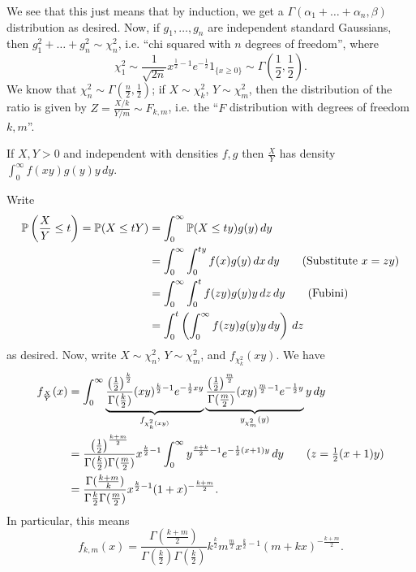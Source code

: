 We see that this just means that by induction, we get a $\Gamma(\alpha_1 + \dots + \alpha_n, \beta)$ distribution as desired. Now, if $g_1, \dots, g_n$ are independent standard Gaussians, then $g_1^2 + \dots + g_n^2 \sim \chi_n^2$, i.e. ``chi squared with $n$ degrees of freedom'', where
\[ \chi_1^2 \sim \frac{1}{\sqrt{2n}} x^{\frac{1}{2} - 1} e^{-\frac{1}{2}} 1_{\{x \geq 0\}} \sim \Gamma\left(\frac{1}{2}, \frac{1}{2}\right). \]
We know that $\chi_n^2 \sim \Gamma(\frac{n}{2}, \frac{1}{2})$; if $X \sim \chi_k^2$, $Y \sim \chi_m^2$, then the distribution of the ratio is given by $Z = \frac{X/k}{Y/m} \sim F_{k, m}$, i.e. the ``$F$ distribution with degrees of freedom $k, m$''.
\begin{simplelemma}
    If $X, Y > 0$ and independent with densities $f, g$ then $\frac{X}{Y}$ has density $\int_0^\infty f(xy)g(y) y \, dy$.
\end{simplelemma}
\noindent Write
\begin{align*}
    \mathbb P \left( \frac{X}{Y} \leq t \right) = \mathbb P(X \leq tY) &= \int_0^\infty \mathbb P(X \leq ty) g(y) \, dy \\
    &= \int_0^\infty \int_0^{ty} f(x) g(y) \, dx \, dy \tag{Substitute $x = zy$} \\
    &= \int_0^\infty \int_0^t f(zy) g(y) y \, dz \, dy \tag{Fubini} \\
    &= \int_0^t \left(\int_0^\infty f(zy) g(y) y \, dy \right) \, dz
\end{align*}
as desired. Now, write $X \sim \chi_n^2$, $Y \sim \chi_m^2$, and $f_{\chi_k^2} (xy)$. We have
\begin{align*}
    f_{\frac{X}{Y}}(x) &= \int_0^\infty \underbrace{\frac{\left(\frac{1}{2}\right)^\frac{k}{2}}{\Gamma(\frac{k}{2})} (xy)^{\frac{k}{2} - 1} e^{-\frac{1}{2}xy}}_{f_{\chi_k^2 (xy)}} \underbrace{\frac{\left(\frac{1}{2}\right)^\frac{m}{2}}{\Gamma(\frac{m}{2})} (xy)^{\frac{m}{2} - 1} e^{-\frac{1}{2}y}}_{y_{\chi_m^2}(y)} y \, dy \\
    &= \frac{\left(\frac{1}{2}\right)^{\frac{k+m}{2}}}{\Gamma(\frac{k}{2}) \Gamma(\frac{m}{2})} x^{\frac{k}{2} - 1} \int_0^\infty y^{\frac{x+k}{2} - 1} e^{-\frac{1}{2}(x + 1) y} \, dy \tag{$z = \frac{1}{2}(x + 1)y$} \\
    &= \frac{\Gamma(\frac{k+m}{k})}{\Gamma{\frac{k}{2}} \Gamma(\frac{m}{2}) } x^{\frac{k}{2} - 1} (1 + x)^{- \frac{k + m}{2}}.
\end{align*}
In particular, this means
\[ f_{k, m}(x) = \frac{\Gamma(\frac{k+m}{2})}{\Gamma(\frac{k}{2}) \Gamma(\frac{k}{2}) } k^{\frac{k}{2}} m^{\frac{m}{2}} x^{\frac{k}{2} - 1} (m + kx)^{-\frac{k+m}{2}}. \]
